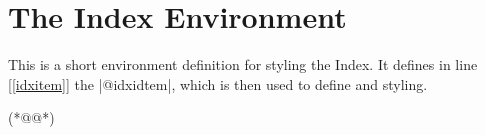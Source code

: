 \begin{teX}
\newdimen\bibindent
\setlength\bibindent{1.5em}
\newenvironment{thebibliography}[1]
     {\chapter*{\bibname}%
      \@mkboth{\MakeUppercase\bibname}{\MakeUppercase\bibname}%
      \list{\@biblabel{\@arabic\c@enumiv}}%
           {\settowidth\labelwidth{\@biblabel{#1}}%
            \leftmargin\labelwidth
            \advance\leftmargin\labelsep
            \@openbib@code
            \usecounter{enumiv}%
            \let\p@enumiv\@empty
            \renewcommand\theenumiv{\@arabic\c@enumiv}}%
      \sloppy
      \clubpenalty4000
      \@clubpenalty \clubpenalty
      \widowpenalty4000%
      \sfcode`\.\@m}
     {\def\@noitemerr
       {\@latex@warning{Empty `thebibliography' environment}}%
      \endlist}
\newcommand\newblock{\hskip .11em\@plus.33em\@minus.07em}
\let\@openbib@code\@empty
\end{teX}

\section*{The Index Environment}
This is a short environment definition for styling the Index. It defines in line [\ref{idxitem}] the 
|@idxidtem|, which is then used to define  and  styling.

\begin{teX}
\newenvironment{theindex}
   {\if@twocolumn
      \@restonecolfalse
      \else
         \@restonecoltrue
      \fi
      \twocolumn[\@makeschapterhead{\indexname}]%
      \@mkboth{\MakeUppercase\indexname}%
              {\MakeUppercase\indexname}%
                \thispagestyle{plain}\parindent\z@
                \parskip\z@ \@plus .3\p@\relax
                \columnseprule \z@
                \columnsep 35\p@
                \let\item\@idxitem}
      {\if@restonecol\onecolumn\else\clearpage\fi}
\newcommand\@idxitem{\par\hangindent 40\p@} (*@\label{idxitem}@*)
\newcommand\subitem{\@idxitem \hspace*{20\p@}}
\newcommand\subsubitem{\@idxitem \hspace*{30\p@}}
\newcommand\indexspace{\par \vskip 10\p@ \@plus5\p@ \@minus3\p@\relax}
\end{teX}

